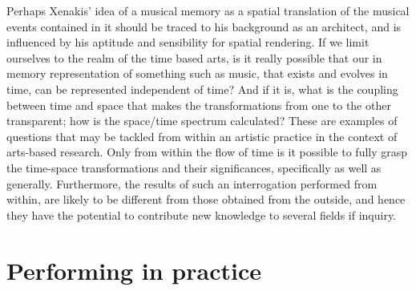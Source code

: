 Perhaps Xenakis' idea of a musical memory as a spatial translation of the musical events contained in it should be traced to his background as an architect, and is influenced by his aptitude and sensibility for spatial rendering. If we limit ourselves to the realm of the time based arts, is it really possible that our in memory representation of something such as music, that exists and evolves in time, can be represented independent of time? And if it is, what is the coupling between time and space that makes the transformations from one to the other transparent; how is the space/time spectrum calculated? These are examples of questions that may be tackled from within an artistic practice in the context of arts-based research. Only from within the flow of time is it possible to fully grasp the time-space transformations and their significances, specifically as well as generally. Furthermore, the results of such an interrogation performed from within, are likely to be different from those obtained from the outside, and hence they have the potential to contribute new knowledge to several fields if inquiry.



\section{Performing in practice}
\label{sec:performing-practice}

